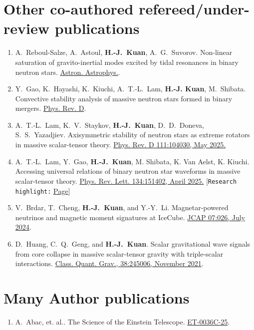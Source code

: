 \documentclass[10pt,floatfix,a4paper]{article}
\begin{document}
\section*{Other co-authored refereed/under-review publications}
\begin{enumerate}
	\item A.~Reboul-Salze, A.~Astoul, \textbf{H.-J.~Kuan}, A.~G.~Suvorov. Non-linear saturation of gravito-inertial modes excited by tidal resonances in binary neutron stars. \href{https://arxiv.org/abs/2503.24154}{Astron. Astrophys.}.
	\item Y.~Gao, K.~Hayashi, K.~Kiuchi, A.~T.-L.~Lam, \textbf{H.-J. Kuan}, M.~Shibata. Convective stability analysis of massive neutron stars formed in binary mergers. \href{https://arxiv.org/abs/2501.19053}{Phys. Rev. D}.
	\item A.~T.-L.~Lam, K.~V.~Staykov, \textbf{H.-J.~Kuan}, D.~D.~Doneva, S.~S.~Yazadjiev. Axisymmetric stability of neutron stars as extreme rotators in massive scalar-tensor theory. \href{https://journals.aps.org/prd/abstract/10.1103/PhysRevD.111.104030}{Phys. Rev. D 111:104030, May 2025.}
	\item A.~T.-L.~Lam, Y.~Gao, \textbf{H.-J.~Kuan}, M. Shibata, K. Van Aelst, K. Kiuchi. Accessing universal relations of binary neutron star waveforms in massive scalar-tensor theory. \href{https://journals.aps.org/prl/abstract/10.1103/PhysRevLett.134.151402}{Phys. Rev. Lett. 134:151402, April 2025.} [\texttt{Research highlight:} \href{https://www.aei.mpg.de/1246017/modelling-120-binary-neutron-star-mergers?c=26149}{Page}]
	\item V.~Brdar, T.~Cheng, \textbf{H.-J.~Kuan}, and Y.-Y.~Li. Magnetar-powered neutrinos and magnetic moment signatures at IceCube. \href{https://iopscience.iop.org/article/10.1088/1475-7516/2024/07/026}{JCAP 07:026, July 2024}. 
	\item D.~Huang, C.~Q.~Geng, and \textbf{H.-J.~Kuan}. Scalar gravitational wave signals from core collapse in massive scalar-tensor gravity with triple-scalar interactions. \href{https://doi.org/10.1088/1361-6382/ac35ab}{Class. Quant. Grav., 38:245006, November 2021}.
\end{enumerate}

\section*{Many Author publications}
\begin{enumerate}
	\item A.~Abac, et. al.. The Science of the Einstein Telescope. \href{https://arxiv.org/abs/2503.12263}{ET-0036C-25}.
\end{enumerate}
\end{document}
